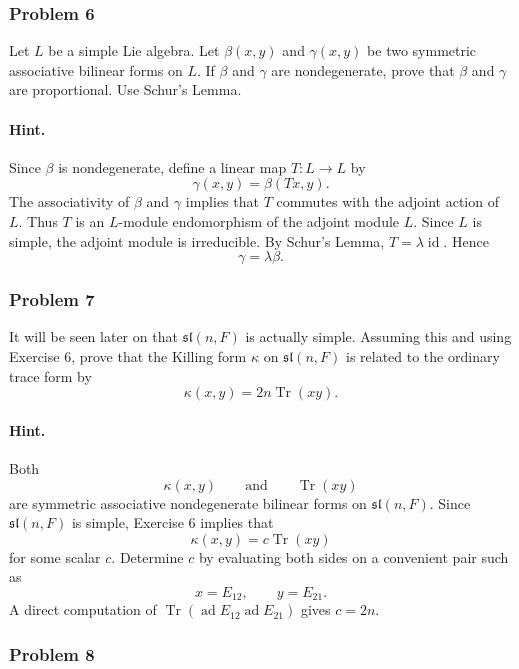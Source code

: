 \documentclass[12pt, a4paper]{article}
\begin{document}
\subsubsection{Problem 6}

Let \(L\) be a simple Lie algebra. Let \(\beta(x,y)\) and \(\gamma(x,y)\) be two
symmetric associative bilinear forms on \(L\). If \(\beta\) and \(\gamma\) are
nondegenerate, prove that \(\beta\) and \(\gamma\) are proportional. Use
Schur's Lemma.

\paragraph{Hint.}
Since \(\beta\) is nondegenerate, define a linear map \(T:L\to L\) by
\[
\gamma(x,y)=\beta(Tx,y).
\]
The associativity of \(\beta\) and \(\gamma\) implies that \(T\) commutes with
the adjoint action of \(L\). Thus \(T\) is an \(L\)-module endomorphism of the
adjoint module \(L\). Since \(L\) is simple, the adjoint module is irreducible.
By Schur's Lemma, \(T=\lambda\operatorname{id}\). Hence
\[
\gamma=\lambda\beta.
\]

\subsubsection{Problem 7}

It will be seen later on that \(\mathfrak{sl}(n,F)\) is actually simple.
Assuming this and using Exercise 6, prove that the Killing form \(\kappa\) on
\(\mathfrak{sl}(n,F)\) is related to the ordinary trace form by
\[
\kappa(x,y)=2n\operatorname{Tr}(xy).
\]

\paragraph{Hint.}
Both
\[
\kappa(x,y)
\qquad\text{and}\qquad
\operatorname{Tr}(xy)
\]
are symmetric associative nondegenerate bilinear forms on
\(\mathfrak{sl}(n,F)\). Since \(\mathfrak{sl}(n,F)\) is simple, Exercise 6
implies that
\[
\kappa(x,y)=c\operatorname{Tr}(xy)
\]
for some scalar \(c\). Determine \(c\) by evaluating both sides on a convenient
pair such as
\[
x=E_{12},\qquad y=E_{21}.
\]
A direct computation of
\(\operatorname{Tr}(\operatorname{ad}E_{12}\operatorname{ad}E_{21})\) gives
\(c=2n\).

\subsubsection{Problem 8}
\end{document}
